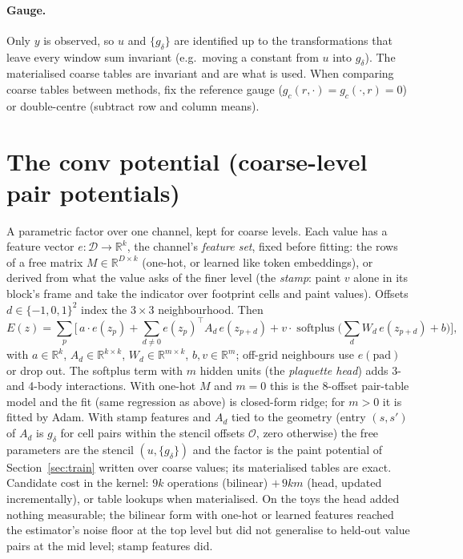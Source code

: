 \documentclass[11pt]{article}
\newcommand{\R}{\mathbb{R}}
\newcommand{\1}{\mathds{1}}
\newcommand{\Dom}{\mathcal{D}}
\DeclareMathOperator{\softplus}{softplus}
\begin{document}
\paragraph{Gauge.} Only $y$ is observed, so $u$ and $\{g_\delta\}$ are identified up to the
transformations that leave every window sum invariant (e.g.\ moving a constant from $u$ into
$g_\delta$). The materialised coarse tables are invariant and are what is used. When comparing
coarse tables between methods, fix the reference gauge ($g_c(r, \cdot) = g_c(\cdot, r) = 0$) or
double-centre (subtract row and column means).

\section{The conv potential (coarse-level pair potentials)}
\label{sec:convpot}

A parametric factor over one channel, kept for coarse levels. Each value has a feature vector
$e : \Dom \to \R^k$, the channel's \emph{feature set}, fixed before fitting: the rows of a free
matrix $M \in \R^{D \times k}$ (one-hot, or learned like token embeddings), or derived from what
the value asks of the finer level (the \emph{stamp}: paint $v$ alone in its block's frame and take
the indicator over footprint cells and paint values). Offsets $d \in \{-1,0,1\}^2$ index the
$3 \times 3$ neighbourhood. Then
\begin{equation}
  E(z) = \sum_p \Big[\, a \cdot e(z_p) + \sum_{d \ne 0} e(z_p)^{\!\top} A_d\, e(z_{p+d})
       + v \cdot \softplus\!\Big(\sum_{d} W_d\, e(z_{p+d}) + b\Big)\Big],
\end{equation}
with $a \in \R^k$, $A_d \in \R^{k\times k}$, $W_d \in \R^{m \times k}$, $b, v \in \R^m$; off-grid
neighbours use $e(\mathrm{pad})$ or drop out. The softplus term with $m$ hidden units (the
\emph{plaquette head}) adds 3- and 4-body interactions. With one-hot $M$ and $m = 0$ this is the
8-offset pair-table model and the fit (same regression as above) is closed-form ridge; for $m > 0$
it is fitted by Adam. With stamp features and $A_d$ tied to the geometry (entry $(s, s')$ of $A_d$ is
$g_\delta$ for cell pairs within the stencil offsets $\mathcal{O}$, zero otherwise) the free
parameters are the stencil $(u, \{g_\delta\})$ and the factor is the paint potential of
Section~\ref{sec:train} written over coarse values; its materialised tables are exact.
Candidate cost in the kernel: $9k$ operations (bilinear) $+\, 9km$ (head, updated incrementally),
or table lookups when materialised. On the toys the head added nothing measurable; the bilinear
form with one-hot or learned features reached the estimator's noise floor at the top level but
did not generalise to held-out value pairs at the mid level; stamp features did.
\end{document}
